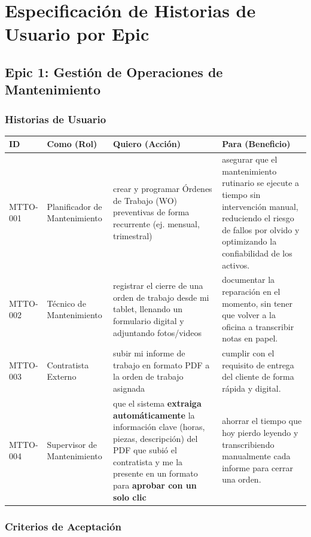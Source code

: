 \documentclass[12pt, a4paper]{article}
\begin{document}
\section{Especificación de Historias de Usuario por Epic}

\subsection{Epic 1: Gestión de Operaciones de Mantenimiento}

\subsubsection*{Historias de Usuario}

\begin{longtable}{|p{2cm}|p{3.5cm}|p{5cm}|p{4.5cm}|}
\hline
\textbf{ID} & \textbf{Como (Rol)} & \textbf{Quiero (Acción)} & \textbf{Para (Beneficio)} \\ \hline
MTTO-001 & Planificador de Mantenimiento & crear y programar Órdenes de Trabajo (WO) preventivas de forma recurrente (ej. mensual, trimestral) & asegurar que el mantenimiento rutinario se ejecute a tiempo sin intervención manual, reduciendo el riesgo de fallos por olvido y optimizando la confiabilidad de los activos. \\ \hline
MTTO-002 & Técnico de Mantenimiento & registrar el cierre de una orden de trabajo desde mi tablet, llenando un formulario digital y adjuntando fotos/videos & documentar la reparación en el momento, sin tener que volver a la oficina a transcribir notas en papel. \\ \hline
MTTO-003 & Contratista Externo & subir mi informe de trabajo en formato PDF a la orden de trabajo asignada & cumplir con el requisito de entrega del cliente de forma rápida y digital. \\ \hline
MTTO-004 & Supervisor de Mantenimiento & que el sistema \textbf{extraiga automáticamente} la información clave (horas, piezas, descripción) del PDF que subió el contratista y me la presente en un formato para \textbf{aprobar con un solo clic} & ahorrar el tiempo que hoy pierdo leyendo y transcribiendo manualmente cada informe para cerrar una orden. \\ \hline
\end{longtable}

\subsubsection*{Criterios de Aceptación}
\end{document}
